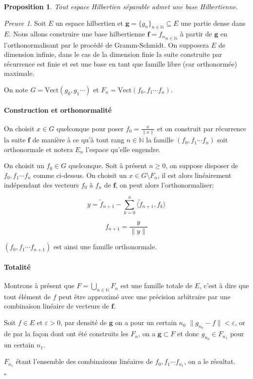 \documentclass[]{article}
\newtheorem{myproposition}{Proposition}
\theoremstyle{remark}
\newtheorem{myproof}{Preuve}
\theoremstyle{definition}
\newcommand{\cqfd}{
	\hfill$\square$
}
\newcommand{\vect}{\text{Vect}}
\newcommand{\DS}{\displaystyle}
\begin{document}
	\begin{myproposition}
		Tout espace Hilbertien séparable admet une base Hilbertienne.
	\end{myproposition}
	
	\begin{myproof}
		Soit $E$ un espace hilbertien et $\mathbf{g} = \{g_n\}_{n \in \mathbb{N}} \subseteq E$ une partie dense dans $E$. Nous allons construire une base hilbertienne $\mathbf{f} = {f_n}_{n \in \mathbb{N}}$ à partir de $\mathbf{g}$ en l'orthonormalisant par le procédé de Gramm-Schmidt.
		On supposera $E$ de dimension infinie, dans le cas de la dimension finie la suite construite par récurrence est finie et est une base en tant que famille libre (car orthonormée) maximale.
		
		
		On note $G = \vect (g_0, g_1 \cdots )$ et $F_n = \vect (f_0, f_1 \cdots f_n)$.
		
		\paragraph{Construction et orthonormalité}
		
		On choisit $x \in G$ quelconque pour poser $\DS f_0 = \frac{x}{\|x\|}$ et on construit par récurrence la suite $\mathbf{f}$ de manière à ce qu'à tout rang $n \in \mathbb{N}$ la famille $(f_0, f_1 \cdots f_n)$ soit orthonormale et notera $E_n$ l'espace qu'elle engendre.
		
		On choisit un $f_0 \in G$ quelconque. Soit à présent $n \geqslant 0$, on suppose disposer de $f_0, f_1 \cdots f_n$ comme ci-dessus. On choisit un $x \in G \setminus F_n$, il est alors linéairement indépendant des vecteurs $f_0$ à $f_n$ de $\mathbf{f}$, on peut alors l'orthonormaliser:
		
		$$y = \widetilde{f}_{n+1} - \sum_{k = 0}^{n} \langle \widetilde{f}_{n+1}, f_k \rangle$$
		
		$$f_{n+1} = \frac{y}{\|y\|}$$
		
		$(f_0, f_1 \cdots f_{n+1})$ est ainsi une famille orthonormale.
		
		\paragraph{Totalité}
		
		Montrons à présent que $F = \bigcup_{n \in \mathbb{N}} F_n$ est une famille totale de $E$, c'est à dire que tout élément de $f$ peut être approximé avec une précision arbitraire par une combinaison linéaire de vecteurs de $\mathbf{f}$.
		
		Soit $f \in E$ et $\varepsilon > 0$, par densité de $\mathbf{g}$ on a pour un certain $n_0$ $\|g_{n_0} - f\| < \varepsilon$, or de par la façon dont ont été construits les $F_n$, on a $\mathbf{g} \subset F$ et donc $g_{n_0} \in F_{n_1}$ pour un certain $n_1$.
		
		$F_{n_1}$ étant l'ensemble des combinaisons linéaires de $f_0, f_1 \cdots f_{n_1}$, on a le résultat.
		
		\cqfd
	\end{myproof}
	
\end{document}
